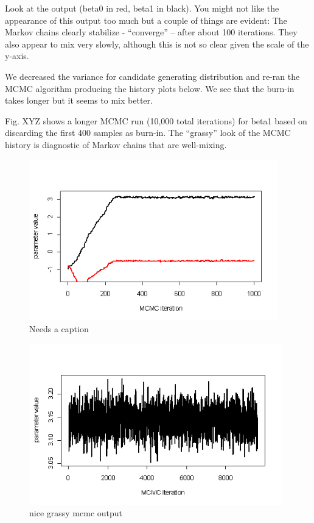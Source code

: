 Look at the output (beta0 in red, beta1 in black). You might not like the appearance of this output too much but a couple of things are evident: The Markov chains clearly stabilize - ``converge'' --  after about 100 iterations. They also appear to mix very slowly, although this is not so clear given the scale of the y-axis.
 

We decreased the variance for candidate generating distribution and
re-ran the MCMC algorithm producing the history plots below. We see
that the burn-in takes longer but it seems to mix better.


Fig. XYZ shows a longer MCMC run (10,000 total iterations) for beta1
based on discarding the first 400 samples as burn-in. The ``grassy''
look of the MCMC history is diagnostic of Markov chains that are
well-mixing.

\begin{figure}
\begin{center}
\includegraphics[height=2.75in]{figs/MCMC2}
\end{center}
\caption{Needs a caption}
\label{fig.MCMC2}
\end{figure}


\begin{figure}
\begin{center}
\includegraphics[height=2.75in]{figs/MCMC3}
\end{center}
\caption{nice grassy mcmc output}
\label{glms.fig.grassy}
\end{figure}


